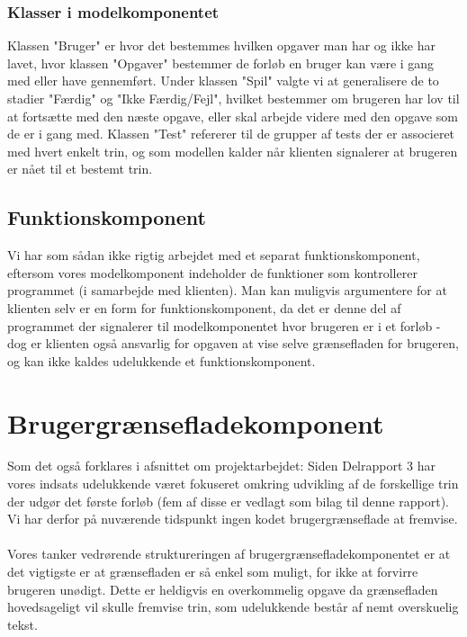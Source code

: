 \documentclass[10pt,a4paper,danish]{article}
\begin{document}
\subsubsection{Klasser i modelkomponentet}
Klassen "Bruger" er hvor det bestemmes hvilken opgaver man har og ikke har
lavet, hvor klassen "Opgaver" bestemmer de forløb en bruger kan være i gang med
eller have gennemført. Under klassen "Spil" valgte 
vi at generalisere de to stadier "Færdig" og "Ikke Færdig/Fejl", hvilket bestemmer om brugeren 
har lov til at fortsætte med den næste opgave, eller skal arbejde videre med den 
opgave som de er i gang med. Klassen "Test" refererer til de grupper af tests
der er associeret med hvert enkelt trin, og som modellen kalder når klienten 
signalerer at brugeren er nået til et bestemt trin.  

\subsection{Funktionskomponent}
Vi har som sådan ikke rigtig arbejdet med et separat funktionskomponent, eftersom vores
modelkomponent indeholder de funktioner som kontrollerer programmet (i 
samarbejde med klienten). Man kan muligvis argumentere for at klienten selv 
er en form for funktionskomponent, da det er denne del af programmet der 
signalerer til modelkomponentet hvor brugeren er i et forløb - dog er 
klienten også ansvarlig for opgaven at vise selve grænsefladen for brugeren, og
kan ikke kaldes udelukkende et funktionskomponent. 

\section{Brugergrænsefladekomponent}
Som det også forklares i afsnittet om projektarbejdet: Siden Delrapport 3 har vores 
indsats udelukkende været fokuseret omkring udvikling af de forskellige trin der udgør
det første forløb (fem af disse er vedlagt som bilag til denne rapport). Vi har derfor
på nuværende tidspunkt ingen kodet brugergrænseflade at fremvise. 

\paragraph{}
Vores tanker vedrørende struktureringen af brugergrænsefladekomponentet er at det vigtigste
er at grænsefladen er så enkel som muligt, for ikke at forvirre brugeren unødigt. Dette
er heldigvis en overkommelig opgave da grænsefladen hovedsageligt vil skulle fremvise
trin, som udelukkende består af nemt overskuelig tekst. 
\end{document}
